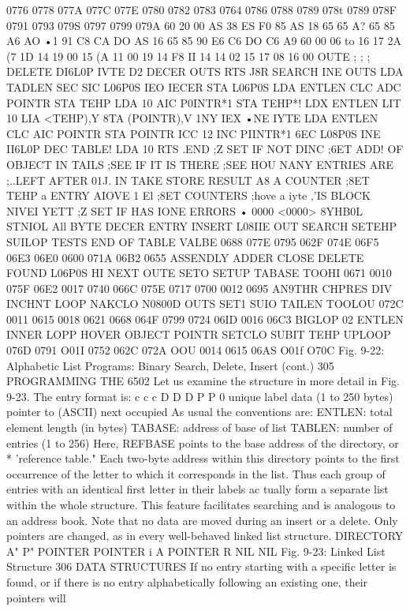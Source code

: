 {{{{{{{{{{0776
0778
077A
077C
077E
0780
0782
0783
0764
0786
0788
0789
078t
0789
078F
0791
0793
079S
0797
0799
079A
60
20
00
AS
38
ES
F0
85
AS
18
65
65
A?
65
85
A6
AO
•1
91
C8
CA
DO
AS
16
65
85
90
E6
C6
DO
C6
A9
60
00 06
to
16
17
2A
(7
1D
14
19
00
15
(A
11
00
19
14
F8
II
14
14
02
15
17
08
16
00
OUTE
;
;
;
DELETE
DI6L0P
IVTE
D2
DECER
OUTS
RTS
J8R SEARCH
INE OUTS
LDA TADLEN
SEC
SIC L06P0S
IEO IECER
STA L06P0S
LDA ENTLEN
CLC
ADC POINTR
STA TEHP
LDA 10
AIC P0INTR*1
STA TEHP*!
LDX ENTLEN
LIT 10
LIA <TEHP),Y
8TA (POINTR),V
1NY
IEX
•NE IYTE
LDA ENTLEN
CLC
AIC POINTR
STA POINTR
ICC 12
INC PIINTR*1
6EC L08P0S
INE II6L0P
DEC TABLE!
LDA 10
RTS
.END
;Z SET IF NOT DINC
;6ET ADD! OF OBJECT IN TAILS
;SEE IF IT IS THERE
;SEE HOU NANY ENTRIES ARE
;..LEFT AFTER 01J. IN TAKE
}STORE RESULT A8 A COUNTER
;8ET TEHP a ENTRY AIOVE 1 El
;8ET COUNTERS
;hove a iyte
,'IS BLOCK NIVEI YETT
;Z SET IF HAS IONE
ERRORS • 0000 <0000>
8YHB0L
STNIOL
All
BYTE
DECER
ENTRY
INSERT
L08IIE
OUT
SEARCH
SETEHP
SUILOP
TESTS
END OF
TABLE
VALBE
0688
077E
0795
062F
074E
06F5
06E3
06E0
0600
071A
06B2
0655
ASSENDLY
ADDER
CLOSE
DELETE
FOUND
L06P0S
HI
NEXT
OUTE
SETO
SETUP
TABASE
TOOHI
0671
0010
075F
06E2
0017
0740
066C
075E
0717
0700
0012
0695
AN9THR
CHPRES
DIV
INCHNT
LOOP
NAKCLO
N0800D
OUTS
SET1
SUIO
TAILEN
TOOLOU
072C
0011
0615
0018
0621
0668
064F
0799
0724
06ID
0016
06C3
BIGLOP
02
ENTLEN
INNER
LOPP
HOVER
OBJECT
POINTR
SETCLO
SUBIT
TEHP
UPLOOP
076D
0791
O01I
0752
062C
072A
OOU
0014
0615
06AS
O01f
O70C
Fig. 9-22: Alphabetic List Programs: Binary Search, Delete, Insert (cont.)
305
PROGRAMMING THE 6502
Let us examine the structure in more detail in Fig. 9-23.
The entry format is:
c c c D D D P P 0
unique label data (1 to 250 bytes) pointer to
(ASCII) next
occupied
As usual the conventions are:
ENTLEN: total element length (in bytes)
TABASE: address of base of list
TABLEN: number of entries (1 to 256)
Here, REFBASE points to the base address of the directory, or
* 'reference table."
Each two-byte address within this directory points to the first
occurrence of the letter to which it corresponds in the list. Thus
each group of entries with an identical first letter in their labels ac
tually form a separate list within the whole structure. This feature
facilitates searching and is analogous to an address book. Note
that no data are moved during an insert or a delete. Only pointers
are changed, as in every well-behaved linked list structure.
DIRECTORY
A"
P"
POINTER
POINTER
i A
POINTER
R
NIL
NIL
Fig. 9-23: Linked List Structure
306
DATA STRUCTURES
If no entry starting with a specific letter is found, or if there is no
entry alphabetically following an existing one, their pointers will
}}}}}}}}}
